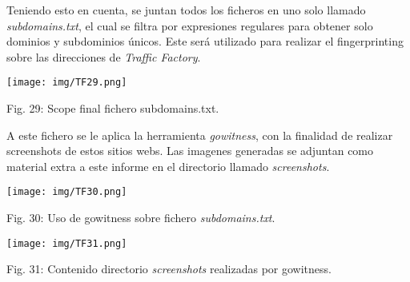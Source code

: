\documentclass[12pt,oneside,a4paper]{book}
\begin{document}
\vspace{1em}

\hspace{20pt}
Teniendo esto en cuenta, se juntan todos los ficheros en uno solo llamado \textit{subdomains.txt}, el cual se filtra por expresiones regulares para obtener solo dominios y subdominios únicos. Este será utilizado para realizar el fingerprinting sobre las direcciones de \textit{Traffic Factory}.

\vspace{2em}

\begin{center}
	\texttt{[image: img/TF29.png]}
    
\vspace{0.1em}
    
    Fig. 29: Scope final fichero subdomains.txt.
\end{center}

\vspace{2em}


\hspace{20pt}
A este fichero se le aplica la herramienta \textit{gowitness}, con la finalidad de realizar screenshots de estos sitios webs. Las imagenes generadas se adjuntan como material extra a este informe en el directorio llamado \textit{screenshots}.

\vspace{2em}

\begin{center}
	\texttt{[image: img/TF30.png]}
    
\vspace{0.1em}
    
    Fig. 30: Uso de gowitness sobre fichero \textit{subdomains.txt}.
\end{center}

\vspace{2em}

\begin{center}
	\texttt{[image: img/TF31.png]}
    
\vspace{0.1em}
    
    Fig. 31: Contenido directorio \textit{screenshots} realizadas por gowitness.
\end{center}

\vspace{2em}

\newpage
\end{document}
